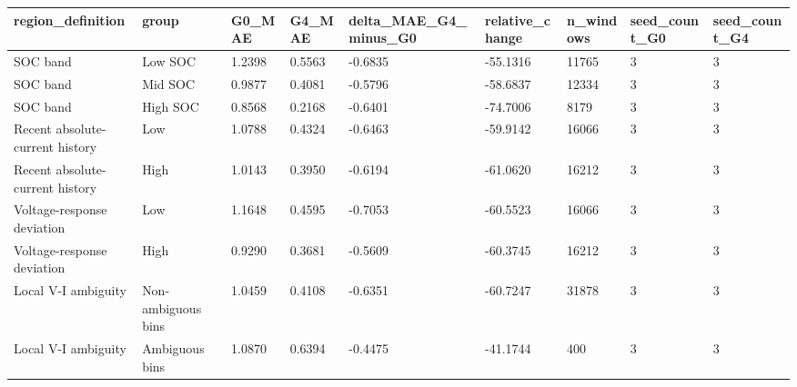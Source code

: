 \begin{tabular}{lllllllll}
\hline
region_definition & group & G0_MAE & G4_MAE & delta_MAE_G4_minus_G0 & relative_change & n_windows & seed_count_G0 & seed_count_G4 \\
\hline
SOC band & Low SOC & 1.2398 & 0.5563 & -0.6835 & -55.1316 & 11765 & 3 & 3 \\
SOC band & Mid SOC & 0.9877 & 0.4081 & -0.5796 & -58.6837 & 12334 & 3 & 3 \\
SOC band & High SOC & 0.8568 & 0.2168 & -0.6401 & -74.7006 & 8179 & 3 & 3 \\
Recent absolute-current history & Low & 1.0788 & 0.4324 & -0.6463 & -59.9142 & 16066 & 3 & 3 \\
Recent absolute-current history & High & 1.0143 & 0.3950 & -0.6194 & -61.0620 & 16212 & 3 & 3 \\
Voltage-response deviation & Low & 1.1648 & 0.4595 & -0.7053 & -60.5523 & 16066 & 3 & 3 \\
Voltage-response deviation & High & 0.9290 & 0.3681 & -0.5609 & -60.3745 & 16212 & 3 & 3 \\
Local V-I ambiguity & Non-ambiguous bins & 1.0459 & 0.4108 & -0.6351 & -60.7247 & 31878 & 3 & 3 \\
Local V-I ambiguity & Ambiguous bins & 1.0870 & 0.6394 & -0.4475 & -41.1744 & 400 & 3 & 3 \\
\hline
\end{tabular}
